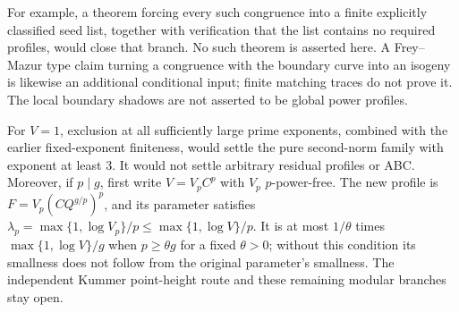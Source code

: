 For example, a theorem forcing every such congruence into a finite
explicitly classified seed list, together with verification that the
list contains no required profiles, would close that branch. No such
theorem is asserted here. A Frey--Mazur type claim turning a congruence
with the boundary curve into an isogeny is likewise an additional
conditional input; finite matching traces do not prove it. The local
boundary shadows are not asserted to be global power profiles.

For $V=1$, exclusion at all sufficiently large prime exponents, combined
with the earlier fixed-exponent finiteness, would settle the pure
second-norm family with exponent at least $3$. It would not settle
arbitrary residual profiles or ABC. Moreover, if $p\mid g$, first
write $V=V_pC^p$ with $V_p$ $p$-power-free. The new profile is
$F=V_p(CQ^{g/p})^p$, and its parameter satisfies
$\lambda_p=\max\{1,\log V_p\}/p\le\max\{1,\log V\}/p$.
It is at most $1/\theta$ times $\max\{1,\log V\}/g$ when
$p\ge\theta g$ for a fixed $\theta>0$; without this condition its
smallness does not follow from the original parameter's smallness.
The independent Kummer point-height route and these remaining modular
branches stay open.
